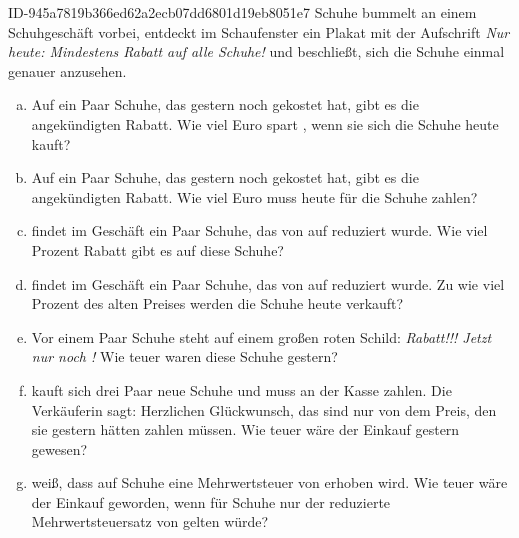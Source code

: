 \begin{exercise}
      {ID-945a7819b366ed62a2ecb07dd6801d19eb8051e7}
      {Schuhe}
  \ifproblem\problem
    \xxa{} bummelt an einem Schuhgeschäft vorbei, entdeckt im Schaufenster ein
    Plakat mit der Aufschrift {\itshape\glqq Nur heute: Mindestens  Rabatt
    auf alle Schuhe!\grqq} und beschließt, sich die Schuhe einmal genauer anzusehen.
    \begin{enumerate}[a)]
      \item Auf ein Paar Schuhe, das gestern noch  gekostet hat, gibt es
            die angekündigten  Rabatt. Wie viel Euro spart \xxa, wenn sie
            sich die Schuhe heute kauft?
      \item Auf ein Paar Schuhe, das gestern noch  gekostet hat, gibt es
            die angekündigten  Rabatt. Wie viel Euro muss \xxa{} heute
            für die Schuhe zahlen?
      \item \xxa{} findet im Geschäft ein Paar Schuhe, das von  auf
             reduziert wurde. Wie viel Prozent Rabatt gibt es auf
            diese Schuhe?
      \item \xxa{} findet im Geschäft ein Paar Schuhe, das von  auf
             reduziert wurde. Zu wie viel Prozent des alten
            Preises werden die Schuhe heute verkauft?
      \item Vor einem Paar Schuhe steht auf einem großen roten Schild:
            {\itshape\glqq {} Rabatt!!! Jetzt nur noch !\grqq}
            Wie teuer waren diese Schuhe gestern?
      \item \xxa{} kauft sich drei Paar neue Schuhe und muss an der Kasse
             zahlen. Die Verkäuferin sagt: \glqq Herzlichen
            Glückwunsch, das sind nur  von dem Preis, den sie gestern
            hätten zahlen müssen.\grqq{}
            Wie teuer wäre der Einkauf gestern gewesen?
      \item \xxa{} weiß, dass auf Schuhe eine Mehrwertsteuer von  erhoben
            wird. Wie teuer wäre der Einkauf geworden, wenn für Schuhe nur der
            reduzierte Mehrwertsteuersatz von  gelten würde?
    \end{enumerate}
  \fi
  \ifoutcome\outcome
    \begingroup
      \newcommand{\noeq}{\quad&\quad}
      \newcommand{\eqAA}{0,\!25\cdot\text{\eur{76}}&=\text{\eur{19}}}
      \newcommand{\eqAB}{\noeq}
      \newcommand{\eqAC}{\noeq}
      \newcommand{\eqBA}{0,\!75\cdot\text{\eur{84}}&=\text{\eur{63}}}

\end{exercise}
